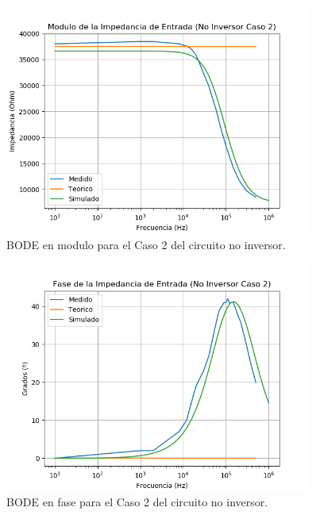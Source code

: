 \begin{figure}[H]	
	\centering
	\includegraphics[width=0.9\textwidth]{Ejercicio1/Imagenes/ZinC2_Noinv.png}
	\caption{BODE en modulo para el Caso 2 del circuito no inversor.}
	\label{fig:NoInvCompZinC2}
\end{figure} 

\begin{figure}[H]	
	\centering
	\includegraphics[width=0.9\textwidth]{Ejercicio1/Imagenes/ZinphC2_Noinv.png}
	\caption{BODE en fase para el Caso 2 del circuito no inversor.}
	\label{fig:NoInvCompZinphC2}
\end{figure} 

